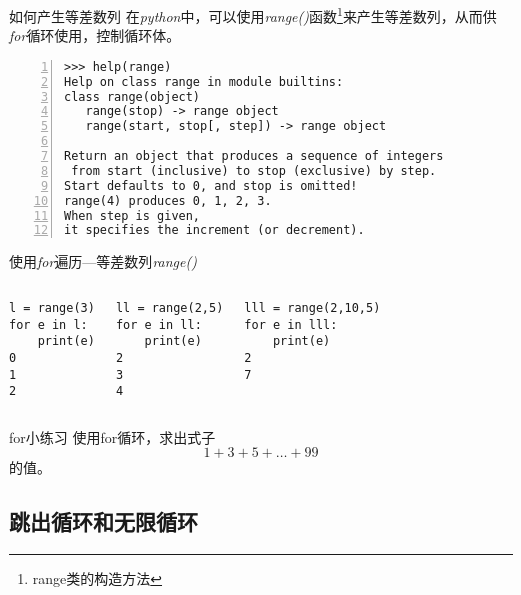 \documentclass{beamer}
\begin{document}
\begin{frame}[fragile]{如何产生等差数列}
在\textit{python}中，可以使用\textit{range()}函数\footnote{range类的构造方法}来产生等差数列，从而供\textit{for}循环使用，控制循环体。
\begin{Verbatim}[numbers=left,frame=single,rulecolor=\color{red}]
>>> help(range)
Help on class range in module builtins:
class range(object)
   range(stop) -> range object
   range(start, stop[, step]) -> range object
   
Return an object that produces a sequence of integers
 from start (inclusive) to stop (exclusive) by step.  
Start defaults to 0, and stop is omitted!  
range(4) produces 0, 1, 2, 3.
When step is given, 
it specifies the increment (or decrement).
\end{Verbatim}
\end{frame}

\begin{frame}[fragile]{使用\textit{for}遍历—等差数列\textit{range()}}

\begin{columns}
\begin{Verbatim}[numbers=none,frame=single,rulecolor=\color{red}]
l = range(3)
for e in l:
    print(e)
0
1
2
\end{Verbatim}

\begin{Verbatim}[numbers=none,frame=single,rulecolor=\color{red}]
ll = range(2,5)
for e in ll:
    print(e)
2
3
4
\end{Verbatim}
\begin{Verbatim}[numbers=none,frame=single,rulecolor=\color{red}]
lll = range(2,10,5)
for e in lll:
    print(e)
2
7
\end{Verbatim}
\end{columns}
\end{frame}

\begin{frame}[fragile]{for小练习}
使用for循环，求出式子\begin{equation*}
1+3+5+…+99
\end{equation*}的值。
\end{frame}
\subsection{跳出循环和无限循环}
\end{document}

